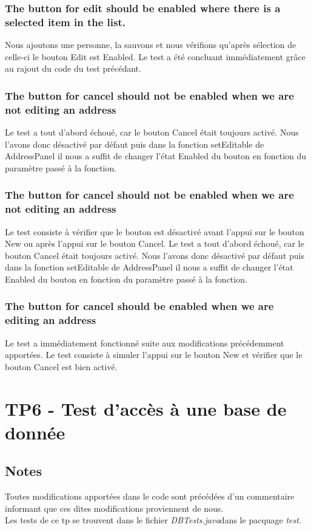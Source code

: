 \documentclass[a4paper,oneside,frenchb,12pt]{report}
\begin{document}
\subsection{The button for edit should be enabled where there is a selected item in the list.}
Nous ajoutons une personne, la sauvons et nous vérifions qu'après sélection 
de celle-ci le bouton Edit est Enabled. Le test a été concluant immédiatement 
grâce au rajout du code du test précédant.

\subsection{The button for cancel should not be enabled when we are not editing an address}
Le test a tout d'abord échoué, car le bouton Cancel était toujours activé. 
Nous l'avons donc désactivé par défaut puis dans la fonction setEditable de 
AddressPanel il nous a suffit de changer l'état Enabled du bouton en fonction 
du paramètre passé à la fonction.

\subsection{The button for cancel should not be enabled when we are not editing an address}
Le test consiste à vérifier que le bouton est désactivé avant l'appui sur le 
bouton New ou après l'appui sur le bouton Cancel.
Le test a tout d'abord échoué, car le bouton Cancel était toujours activé. 
Nous l'avons donc désactivé par défaut puis dans la fonction setEditable de 
AddressPanel il nous a suffit de changer l'état Enabled du bouton en fonction du 
paramètre passé à la fonction.

\subsection{The button for cancel should be enabled when we are editing an address}
Le test a immédiatement fonctionné suite aux modifications précédemment apportées.
Le test consiste à simuler l'appui sur le bouton New et vérifier que le 
bouton Cancel est bien activé.

\chapter{TP6 - Test d’accès à une base de donnée}

\section {Notes}
Toutes modifications apportées dans le code sont précédées d'un commentaire informant que ces dites modifications proviennent de nous.\\
Les tests de ce tp se trouvent dans le fichier \emph{DBTests.java}dans le pacquage \emph{test}.
\end{document}
